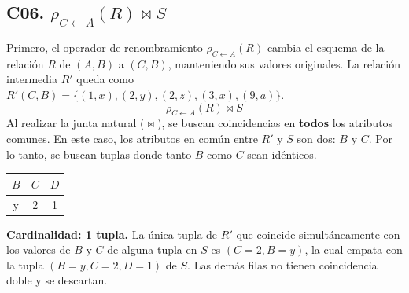 \subsection*{C06. $\rho_{C \leftarrow A}(R) \bowtie S$}
Primero, el operador de renombramiento $\rho_{C \leftarrow A}(R)$ cambia el esquema de la relación $R$ de $(A,B)$ a $(C,B)$, manteniendo sus valores originales. La relación intermedia $R'$ queda como $R'(C,B)=\{(1,x),(2,y),(2,z),(3,x),(9,a)\}$.
\[ \rho_{C \leftarrow A}(R) \bowtie S \]
Al realizar la junta natural ($\bowtie$), se buscan coincidencias en \textbf{todos} los atributos comunes. En este caso, los atributos en común entre $R'$ y $S$ son dos: $B$ y $C$. Por lo tanto, se buscan tuplas donde tanto $B$ como $C$ sean idénticos.
\begin{center}\begin{tabular}{ccc}\toprule\rowcolor{Fondo} $B$ & $C$ & $D$\\\midrule
y & 2 & 1\\\bottomrule\end{tabular}\end{center}
\textbf{Cardinalidad: 1 tupla.} La única tupla de $R'$ que coincide simultáneamente con los valores de $B$ y $C$ de alguna tupla en $S$ es $(C=2, B=y)$, la cual empata con la tupla $(B=y, C=2, D=1)$ de $S$. Las demás filas no tienen coincidencia doble y se descartan.